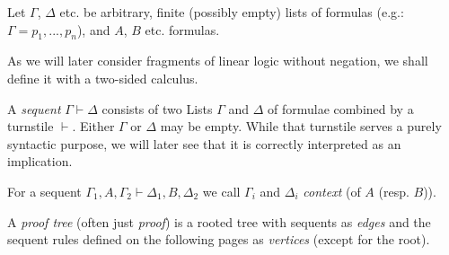 \documentclass[DIN, pagenumber=false, fontsize=11pt, parskip=half, colorinlistoftodos, svgnames]{scrartcl}
\begin{document}
	\begin{convention}
		Let $\Gamma $, $\Delta$ etc. be arbitrary, finite (possibly empty) lists of formulas (e.g.: $\Gamma = p_1, ..., p_n$), and $A$, $B$ etc. formulas.
	\end{convention}
	
	As we will later consider fragments of linear logic without negation, we shall define it with a two-sided calculus. 
	
	\begin{definition}[Sequent]
		A \emph{sequent} $\Gamma \vdash \Delta $ consists of two Lists $\Gamma$ and $\Delta$ of formulae combined by a turnstile $\vdash$. 
		Either $\Gamma$ or $\Delta$ may be empty. 
		While that turnstile serves a purely syntactic purpose, we will later see that it is correctly interpreted as an implication.
		
		For a sequent $\Gamma_1, A, \Gamma_2 \vdash \Delta_1, B, \Delta_2$ we call $\Gamma_i$ and $\Delta_i$ \emph{context} (of $A$ (resp. $B$)).
	\end{definition}
	
	\begin{definition}
		A \emph{proof tree} (often just \emph{proof}) is a rooted tree with sequents as \emph{edges} and the sequent rules defined on the following pages as \emph{vertices} (except for the root).
	\end{definition}
	
\end{document}
